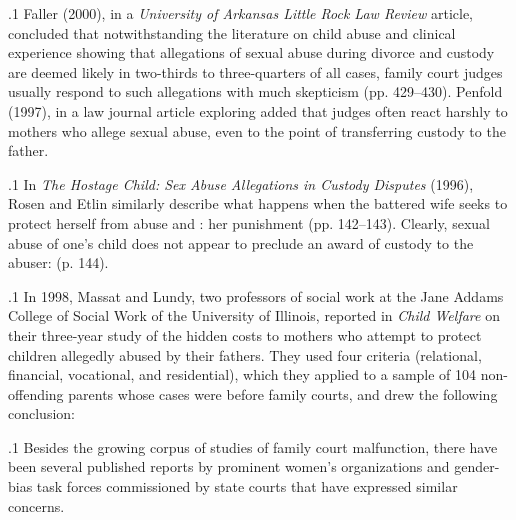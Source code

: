 \documentclass[11pt, twoside]{article}
\begin{document}
{\p.1{%
\:Faller (2000), in a \textit{University of Arkansas Little Rock Law Review} article, concluded that notwithstanding the literature on child abuse and
clinical experience showing that allegations of sexual abuse during divorce and custody are deemed likely in two-thirds to three-quarters
of all cases, family court judges usually respond to such allegations
with much skepticism (pp. 429–430). Penfold (1997), in a law journal article exploring  added that judges often react harshly to mothers who allege sexual abuse, even to the point of transferring custody to the
father.\;
}%

\p.1{%
\:In \textit{The Hostage Child: Sex Abuse Allegations in Custody Disputes}
(1996), Rosen and Etlin similarly describe what happens when the battered wife seeks to protect herself from abuse and : her punishment  (pp. 142–143). Clearly, sexual abuse of one’s child does not
appear to preclude an award of custody to the abuser:  (p. 144).\;
}%

\p.1{%
\:In 1998, Massat and Lundy, two professors of social work at the Jane
Addams College of Social Work of the University of Illinois, reported
in \textit{Child Welfare} on their three-year study of the hidden costs to mothers who attempt to protect children allegedly abused by their fathers.
They used four criteria (relational, financial, vocational, and residential), which they applied to a sample of 104 non-offending parents whose
cases were before family courts, and drew the following conclusion:
\;
}%

\p.1{%
\:Besides the growing corpus of studies of family court malfunction,
there have been several published reports by prominent women’s organizations and gender-bias task forces commissioned by state courts that
have expressed similar concerns.\;
}%

}
\end{document}

